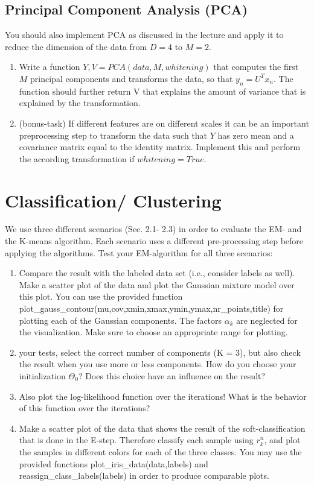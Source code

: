 \documentclass[a4paper]{article}
\begin{document}
\subsection{Principal Component Analysis (PCA)}
You should also implement PCA as discussed in the lecture and apply it to reduce the dimension of the data from $D = 4$ to $M = 2$.
\begin{enumerate}
  \item Write a function $Y,V = PCA(data, M, whitening)$ that computes the first $M$ principal components and transforms the data, so that $y_n = U^T x_n$. The function should further return V that explains the amount of variance that is explained by the transformation.
  \item (bonus-task) If different features are on different scales it can be an important preprocessing step to transform the data such that $Y$ has zero mean and a covariance matrix equal to the identity matrix. Implement this and perform the according transformation if $whitening = True$.
\end{enumerate}

\newpage

\section{Classification/ Clustering}
We use three different scenarios (Sec. 2.1- 2.3) in order to evaluate the EM- and the K-means algorithm. Each scenario uses a different pre-processing step before applying the algorithms. Test your EM-algorithm for all three scenarios:

\begin{enumerate}
  \item Compare the result with the labeled data set (i.e., consider labels as well). Make a scatter plot of the data and plot the Gaussian mixture model over this plot. You can use the provided function plot\_gauss\_contour(mu,cov,xmin,xmax,ymin,ymax,nr\_points,title) for plotting each of the Gaussian components. The factors $\alpha_k$ are neglected for the visualization. Make sure to choose an appropriate range for plotting.  
  
\item your tests, select the correct number of components (K = 3), but also check the result when you use more or less components. How do you choose your initialization $\Theta_0$? Does this choice have an influence on the result?
  
\item Also plot the log-likelihood function over the iterations! What is the behavior of this function over the iterations?

\item Make a scatter plot of the data that shows the result of the soft-classification that is done in the E-step. Therefore classify each sample using $r^n_k$, and plot the samples in different colors for each of the three classes. You may use the provided functions plot\_iris\_data(data,labels) and reassign\_class\_labels(labels) in order to produce comparable plots.
\end{enumerate}
\end{document}
